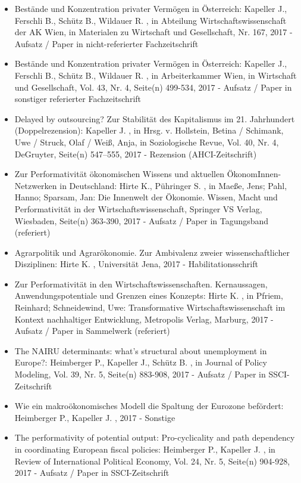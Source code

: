 \begin{itemize}
	 \item Bestände und Konzentration privater Vermögen in Österreich: Kapeller J., Ferschli B., Schütz B., Wildauer R. , in Abteilung Wirtschaftswissenschaft der AK Wien, in Materialen zu Wirtschaft und Gesellschaft, Nr. 167, 2017 - Aufsatz / Paper in nicht-referierter Fachzeitschrift
	 \item Bestände und Konzentration privater Vermögen in Österreich: Kapeller J., Ferschli B., Schütz B., Wildauer R. , in Arbeiterkammer Wien, in Wirtschaft und Gesellschaft, Vol. 43, Nr. 4, Seite(n) 499-534, 2017 - Aufsatz / Paper in sonstiger referierter Fachzeitschrift
	 \item Delayed by outsourcing? Zur Stabilität des Kapitalismus im 21. Jahrhundert (Doppelrezension): Kapeller J. , in Hrsg. v. Hollstein, Betina / Schimank, Uwe / Struck, Olaf / Weiß, Anja, in Soziologische Revue, Vol. 40, Nr. 4, DeGruyter, Seite(n) 547–555, 2017 - Rezension (AHCI-Zeitschrift)
	 \item Zur Performativität ökonomischen Wissens und aktuellen ÖkonomInnen-Netzwerken in Deutschland: Hirte K., Pühringer S. , in Maeße, Jens; Pahl, Hanno; Sparsam, Jan: Die Innenwelt der Ökonomie. Wissen, Macht und Performativität in der Wirtschaftswissenschaft, Springer VS Verlag, Wiesbaden, Seite(n) 363-390, 2017 - Aufsatz / Paper in Tagungsband (referiert)
	 \item Agrarpolitik und Agrarökonomie. Zur Ambivalenz zweier wissenschaftlicher Disziplinen: Hirte K. , Universität Jena, 2017 - Habilitationsschrift
	 \item Zur Performativität in den Wirtschaftswissenschaften. Kernaussagen, Anwendungspotentiale und Grenzen eines Konzepts: Hirte K. , in Pfriem, Reinhard; Schneidewind, Uwe: Transformative Wirtschaftswissenschaft im Kontext nachhaltiger Entwicklung, Metropolis Verlag, Marburg, 2017 - Aufsatz / Paper in Sammelwerk (referiert)
	 \item The NAIRU determinants: what’s structural about unemployment in Europe?: Heimberger P., Kapeller J., Schütz B. , in Journal of Policy Modeling, Vol. 39, Nr. 5, Seite(n) 883-908, 2017 - Aufsatz / Paper in SSCI-Zeitschrift
	 \item Wie ein makroökonomisches Modell die Spaltung der Eurozone befördert: Heimberger P., Kapeller J. , 2017 - Sonstige
	 \item The performativity of potential output: Pro-cyclicality and path dependency in coordinating European fiscal policies: Heimberger P., Kapeller J. , in Review of International Political Economy, Vol. 24, Nr. 5, Seite(n) 904-928, 2017 - Aufsatz / Paper in SSCI-Zeitschrift

\end{itemize}
